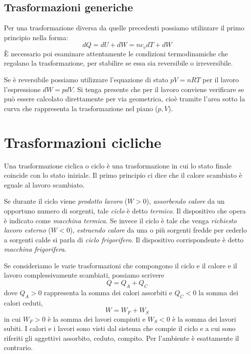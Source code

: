 \documentclass[class=book, crop=false, oneside, 12pt]{standalone}
\begin{document}
\subsection{Trasformazioni generiche}

Per una trasformazione diversa da quelle precedenti possiamo utilizzare il primo principio nella forma:
\begin{equation}
    d Q = d U + d W = n c_v d T + d W
\end{equation}
È necessario poi esaminare attentamente le condizioni termodinamiche che regolano la trasformazione, per stabilire se essa sia reversibile o irreversibile.

Se è reversibile possiamo utilizzare l'equazione di stato \(p V= n R T\) per il lavoro l'espressione \(d W = p d V \). 
Si tenga presente che per il lavoro conviene verificare se può essere calcolato direttamente per via geometrica, cioè tramite l'area sotto la curva che rappresenta la trasformazione nel piano (\(p , V\)).

\section{Trasformazioni cicliche}

Una trasformazione ciclica o ciclo è una trasformazione in cui lo stato finale coincide con lo stato iniziale. 
Il primo principio ci dice che il calore scambiato è eguale al lavoro scambiato.

Se durante il ciclo viene \emph{prodotto lavoro} (\(W > 0 \)), \emph{assorbendo calore} da un opportuno numero di sorgenti, tale \emph{ciclo} è detto \emph{termico}. 
Il dispositivo che opera è indicato come \emph{macchina termica}. 
Se invece il ciclo è tale che venga \emph{richiesto lavoro esterno} (\(W < 0\)), \emph{estraendo calore} da una o più sorgenti fredde per cederlo a sorgenti calde si parla di \emph{ciclo frigorifero}. 
Il dispositivo corrispondente è detto \emph{macchina frigorifera}. 

Se consideriamo le varie trasformazioni che compongono il ciclo e il calore e il lavoro complessivamente scambiati, possiamo scrivere 
\begin{equation*}
    Q = Q_A +Q_C
\end{equation*}
dove \(Q_A>0\) rappresenta la somma dei calori assorbiti e \(Q_C<0\) la somma dei calori ceduti,
\begin{equation*}
    W = W_F + W_S
\end{equation*}
in cui \(W_F >0\) è la somma dei lavori compiuti e \(W_S < 0\) è la somma dei lavori subiti.
I calori e i lavori sono visti dal sistema che compie il ciclo e a cui sono riferiti gli aggettivi assorbito, ceduto, compito. 
Per l'ambiente è esattamente il contrario.
\end{document}
